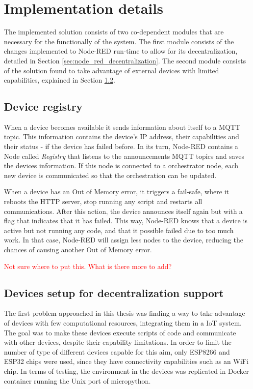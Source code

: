 \section{Implementation details}\label{sec:implementation_details}

The implemented solution consists of two co-dependent modules that are necessary for the functionally of the system. The first module consists of the changes implemented to Node-RED run-time to allow for its decentralization, detailed in Section \ref{sec:node_red_decentralization}. The second module consists of the solution found to take advantage of external devices with limited capabilities, explained in Section \ref{sec:devices_decentralization}.

\subsection{Device registry}\label{sec:registry}

When a device becomes available it sends information about itself to a MQTT topic. This information contains the device's IP address, their capabilities and their status - if the device has failed before. In its turn, Node-RED contains a Node called \textit{Registry} that listens to the announcements MQTT topics and saves the devices information. If this node is connected to a orchestrator node, each new device is communicated so that the orchestration can be updated.

When a device has an Out of Memory error, it triggers a fail-safe, where it reboots the HTTP server, stop running any script and restarts all communications. After this action, the device announces itself again but with a flag that indicates that it has failed. This way, Node-RED knows that a device is active but not running any code, and that it possible failed due to too much work. In that case, Node-RED will assign less nodes to the device, reducing the chances of causing another Out of Memory error.

\textcolor{red}{Not sure where to put this. What is there more to add?}

\subsection{Devices setup for decentralization support}\label{sec:devices_decentralization}

The first problem approached in this thesis was finding a way to take advantage of devices with few computational resources, integrating them in a IoT system. The goal was to make these devices execute scripts of code and communicate with other devices, despite their capability limitations. In order to limit the number of type of different devices capable for this aim, only ESP8266 and ESP32 chips were used, since they have connectivity capabilities such as an WiFi chip. In terms of testing, the environment in the devices was replicated in Docker container running the Unix port of micropython.

